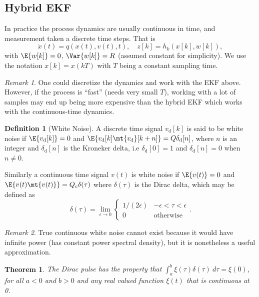 \documentclass[margin=tiny]{hsrzf}
\theoremstyle{plain}
\newtheorem{thm}{Theorem}[section]
\theoremstyle{definition}
\newtheorem{defn}{Definition}[section]
\theoremstyle{remark}
\newtheorem*{remark}{Remark}
\begin{document}
\subsection{Hybrid EKF}

In practice the process dynamics are usually continuous in time, and
measurement taken a discrete time steps. That is
\[
  \dot{x}(t) = q(x(t), v(t), t),
  \quad z[k] = h_k(x[k], w[k]),
\]
with $\E{w[k]} = 0$, $\Var{w[k]} = R$ (assumed constant for simplicity). We
use the notation $x[k] = x(kT)$ with $T$ being a constant sampling time.

\begin{remark}
  One could discretize the dynamics and work with the EKF above. However, if
  the process is ``fast'' (needs very small $T$), working with a lot of
  samples may end up being more expensive than the hybrid EKF which works with
  the continuous-time dynamics.
\end{remark}

\begin{defn}[White Noise]
  A discrete time signal $v_\mathrm{d}[k]$ is said to be white noise if
  $\E{v_\mathrm{d}[k]} = 0$ and $\E{v_\mathrm{d}[k] \mt{v_\mathrm{d}}[k+n]} =
  Q\delta_\mathrm{d}[n]$, where $n$ is an integer and $\delta_\mathrm{d}[n]$
  is the Kroneker delta, i.e $\delta_\mathrm{d}[0] = 1$ and
  $\delta_\mathrm{d}[n] = 0$ when $n \neq 0$.

  Similarly a continuous time signal $v(t)$ is white noise if $\E{v(t)} = 0$
  and $\E{v(t) \mt{v(t)}} = Q_c \delta(\tau)$ where $\delta(\tau)$ is the
  Dirac delta, which may be defined as
  \[
    \delta(\tau) = \lim_{\epsilon \to 0} \begin{cases}
      1/(2\epsilon) & -\epsilon < \tau < \epsilon \\
      0 & \text{otherwise}
    \end{cases}.
  \]
\end{defn}

\begin{remark}
  True continuous white noise cannot exist because it would have infinite
  power (has constant power spectral density), but it is nonetheless a useful
  approximation.
\end{remark}

\begin{thm}
  The Dirac pulse has the property that $\int_a^b \xi(\tau) \delta(\tau)
  ~d\tau = \xi(0)$, for all $a < 0$ and $b > 0$ and any real valued function
  $\xi(t)$ that is continuous at 0.
\end{thm}
\end{document}

